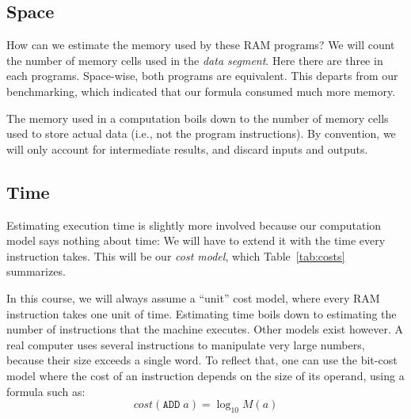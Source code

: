 \documentclass{aldast}
\begin{document}
\subsection{Space}

How can we estimate the memory used by these RAM programs? We will
count the number of memory cells used in the \emph{data segment}. Here
there are three in each programs. Space-wise, both programs are
equivalent. This departs from our benchmarking, which indicated that
our formula consumed much more memory.

\begin{takeaway}
  The memory used in a computation boils down to the number of memory
  cells used to store actual data (i.e., not the program
  instructions). By convention, we will only account for intermediate
  results, and discard inputs and outputs.
\end{takeaway}


\subsection{Time}
Estimating execution time is slightly more involved because our
computation model says nothing about time: We will have to extend it
with the time every instruction takes. This will be our \emph{cost
  model}, which Table~\ref{tab:costs} summarizes.

In this course, we will always assume a ``unit'' cost model, where
every RAM instruction takes one unit of time. Estimating time boils
down to estimating the number of instructions that the machine
executes. Other models exist however. A real computer uses several
instructions to manipulate very large numbers, because their size
exceeds a single word. To reflect that, one can use the bit-cost model
where the cost of an instruction depends on the size of its operand,
using a formula such as:
\begin{equation}
  cost(\mathtt{ADD}\; a)= \log_{10} M(a)
\end{equation}
\end{document}
